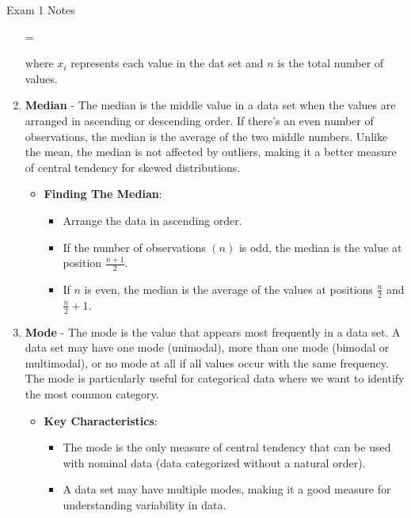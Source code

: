 \begin{examnotes}{Exam 1 Notes}
\begin{enumerate}
        \begin{center}
            \begin{highlightbox}
                 = 
            \end{highlightbox}
        \end{center}
        where $x_{i}$ represents each value in the dat set and $n$ is the total number of values.
        \item \textbf{Median} - The median is the middle value in a data set when the values are arranged in ascending or descending order. If there's an even number of observations, the median is the 
        average of the two middle numbers. Unlike the mean, the median is not affected by outliers, making it a better measure of central tendency for skewed distributions.
        \begin{itemize}
            \item \textbf{Finding The Median}:
            \begin{itemize}
                \item Arrange the data in ascending order.
                \item If the number of observations $(n)$ is odd, the median is the value at position $\frac{n + 1}{2}$.
                \item If $n$ is even, the median is the average of the values at positions $\frac{n}{2}$ and $\frac{n}{2} + 1$.
            \end{itemize}
        \end{itemize}
        \item \textbf{Mode} - The mode is the value that appears most frequently in a data set. A data set may have one mode (unimodal), more than one mode (bimodal or multimodal), or no mode at all 
        if all values occur with the same frequency. The mode is particularly useful for categorical data where we want to identify the most common category.
        \begin{itemize}
            \item \textbf{Key Characteristics}:
            \begin{itemize}
                \item The mode is the only measure of central tendency that can be used with nominal data (data categorized without a natural order).
                \item A data set may have multiple modes, making it a good measure for understanding variability in data.
            \end{itemize}
        \end{itemize}
    \end{enumerate}


\end{examnotes}
